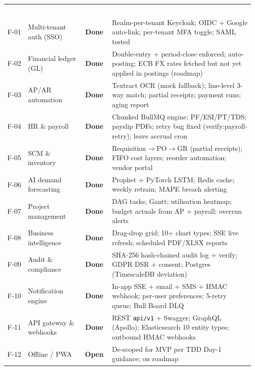 \documentclass[11pt,a4paper]{article}
\newcommand{\statusdone}{\textcolor{okgreen}{\textbf{Done}}}
\newcommand{\statusopen}{\textcolor{gapred}{\textbf{Open}}}
\newcommand{\code}[1]{\texttt{\small #1}}
\begin{document}
\begin{table}[H]
\centering\small
\renewcommand{\arraystretch}{1.3}
\begin{tabularx}{\textwidth}{c l c X}
\toprule
\rowcolor{amdoxnavy}
\textcolor{white}{\textbf{Req}} &
\textcolor{white}{\textbf{Name}} &
\textcolor{white}{\textbf{Status}} &
\textcolor{white}{\textbf{Notes / Deviations}} \\
F-01 & Multi-tenant auth (SSO) & \statusdone &
  Realm-per-tenant Keycloak; OIDC + Google auto-link; per-tenant MFA toggle; SAML tested \\
\rowcolor{amdoxlight}
F-02 & Financial ledger (GL)   & \statusdone &
  Double-entry + period-close enforced; auto-posting; ECB FX rates fetched but not yet applied in postings (roadmap) \\
F-03 & AP/AR automation         & \statusdone &
  Textract OCR (mock fallback); line-level 3-way match; partial receipts; payment runs; aging report \\
\rowcolor{amdoxlight}
F-04 & HR \& payroll            & \statusdone &
  Chunked BullMQ engine; PF/ESI/PT/TDS; payslip PDFs; retry bug fixed (verify:payroll-retry); leave accrual cron \\
F-05 & SCM \& inventory         & \statusdone &
  Requisition$\to$PO$\to$GR (partial receipts); FIFO cost layers; reorder automation; vendor portal \\
\rowcolor{amdoxlight}
F-06 & AI demand forecasting    & \statusdone &
  Prophet + PyTorch LSTM; Redis cache; weekly retrain; MAPE breach alerting \\
F-07 & Project management       & \statusdone &
  DAG tasks; Gantt; utilisation heatmap; budget actuals from AP + payroll; overrun alerts \\
\rowcolor{amdoxlight}
F-08 & Business intelligence    & \statusdone &
  Drag-drop grid; 10+ chart types; SSE live refresh; scheduled PDF/XLSX reports \\
F-09 & Audit \& compliance      & \statusdone &
  SHA-256 hash-chained audit log + verify; GDPR DSR + consent; Postgres (TimescaleDB deviation) \\
\rowcolor{amdoxlight}
F-10 & Notification engine      & \statusdone &
  In-app SSE + email + SMS + HMAC webhook; per-user preferences; 5-retry queue; Bull Board DLQ \\
F-11 & API gateway \& webhooks  & \statusdone &
  REST \code{api/v1} + Swagger; GraphQL (Apollo); Elasticsearch 10 entity types; outbound HMAC webhooks \\
\rowcolor{amdoxlight}
F-12 & Offline / PWA            & \statusopen &
  De-scoped for MVP per TDD Day-1 guidance; on roadmap \\
\bottomrule
\end{tabularx}
\end{table}
\end{document}
